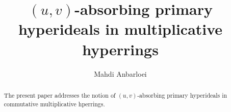 \documentclass[preprint,review,10pt]{amsart}
\theoremstyle{definition}
\theoremstyle{remark}
\numberwithin{equation}{section}
\begin{document}
\title{  $(u,v)$-absorbing primary hyperideals in   multiplicative hyperrings }

\author{Mahdi Anbarloei}
\address{Department of Mathematics, Faculty of Sciences,
Imam Khomeini International University, Qazvin, Iran.
}






 

\begin{abstract}
The present paper addresses the notion of $(u,v)$-absorbing  primary hyperideals in commutative multiplicative hperrings. 

\end{abstract}
\maketitle
\end{document}
